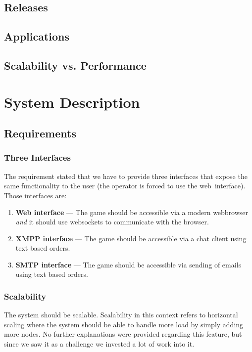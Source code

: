 \documentclass[11pt,a4paper]{report}
\newcommand{\hi}[1]{{\color{red}\em #1\/}\\}
\begin{document}
\section{Releases}
\section{Applications}
\section{Scalability vs. Performance}

\chapter{System Description}

\section{Requirements}

\subsection{Three Interfaces}
The requirement stated that we have to provide three interfaces that expose
the same functionality to the user (the operator is forced to use the
web~interface). Those interfaces are:\\
\begin{enumerate}
\item {\bf Web interface} ---
  The game should be accessible via a modern webbrowser {\em and\/} it should
  use websockets to communicate with the browser.
\item {\bf XMPP interface} ---
  The game should be accessible via a chat client using text based orders.
\item {\bf SMTP interface} ---
  The game should be accessible via sending of emails using text based orders.
\end{enumerate}

\subsection{Scalability}
The system should be scalable. Scalability in this context refers to horizontal scaling where the system should be able to handle more load by simply adding more nodes. No further explanations were provided regarding this feature, but since we saw it as a challenge we invested a lot of work into it.
\end{document}
